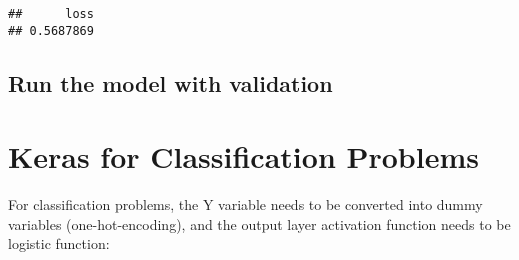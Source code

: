 \documentclass[
]{book}
\newenvironment{Shaded}{\begin{snugshade}}{\end{snugshade}}
\newcommand{\CommentTok}[1]{\textcolor[rgb]{0.56,0.35,0.01}{\textit{#1}}}
\newcommand{\DataTypeTok}[1]{\textcolor[rgb]{0.13,0.29,0.53}{#1}}
\newcommand{\DecValTok}[1]{\textcolor[rgb]{0.00,0.00,0.81}{#1}}
\newcommand{\FloatTok}[1]{\textcolor[rgb]{0.00,0.00,0.81}{#1}}
\newcommand{\KeywordTok}[1]{\textcolor[rgb]{0.13,0.29,0.53}{\textbf{#1}}}
\newcommand{\NormalTok}[1]{#1}
\newcommand{\OperatorTok}[1]{\textcolor[rgb]{0.81,0.36,0.00}{\textbf{#1}}}
\newcommand{\StringTok}[1]{\textcolor[rgb]{0.31,0.60,0.02}{#1}}
\begin{document}
\begin{Shaded}
\end{Shaded}

\begin{verbatim}
##      loss 
## 0.5687869
\end{verbatim}

\hypertarget{run-the-model-with-validation}{%
\subsection{Run the model with validation}\label{run-the-model-with-validation}}

\begin{Shaded}
\end{Shaded}

\hypertarget{keras-for-classification-problems}{%
\section{Keras for Classification Problems}\label{keras-for-classification-problems}}

For classification problems, the Y variable needs to be converted into dummy variables (one-hot-encoding), and the output layer activation function needs to be logistic function:
\end{document}
